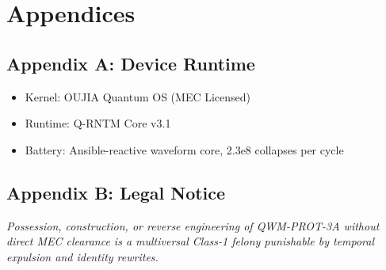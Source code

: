 \documentclass[12pt]{article}
\begin{document}
\section*{Appendices}

\subsection*{Appendix A: Device Runtime}
\begin{itemize}
    \item Kernel: OUJIA Quantum OS (MEC Licensed)
    \item Runtime: Q-RNTM Core v3.1
    \item Battery: Ansible-reactive waveform core, 2.3e8 collapses per cycle
\end{itemize}

\subsection*{Appendix B: Legal Notice}
\textit{Possession, construction, or reverse engineering of QWM-PROT-3A without direct MEC clearance is a multiversal Class-1 felony punishable by temporal expulsion and identity rewrites.}
\end{document}
